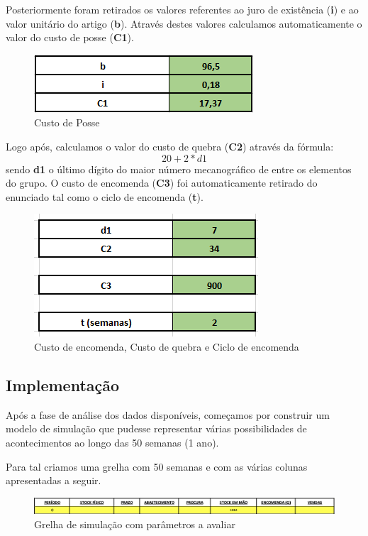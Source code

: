 \documentclass[a4paper]{article}
\begin{document}
Posteriormente foram retirados os valores referentes ao juro de existência (\textbf{i}) e ao valor unitário do artigo (\textbf{b}). Através destes valores calculamos automaticamente o valor do custo de posse (\textbf{C1}).

\begin{figure}[H]
\centering
\includegraphics[scale=0.7]{Posse.png}
\caption{Custo de Posse}
\label{img:Posse}
\end{figure}

Logo após, calculamos o valor do custo de quebra (\textbf{C2}) através da fórmula: $$20+2*d1$$ sendo \textbf{d1} o último dígito do maior número mecanográfico de entre os elementos do grupo.
O custo de encomenda (\textbf{C3}) foi automaticamente retirado do enunciado tal como o ciclo de encomenda (\textbf{t}).

\begin{figure}[H]
\centering
\includegraphics[scale=0.6]{c3c2t.png}
\caption{Custo de encomenda, Custo de quebra e Ciclo de encomenda}
\label{img:C3C2t}
\end{figure}


\subsection{Implementação}

Após a fase de análise dos dados disponíveis, começamos por construir um modelo de simulação que pudesse representar várias possibilidades de acontecimentos ao longo das 50 semanas (1 ano).

Para tal criamos uma grelha com 50 semanas e com as várias colunas apresentadas a seguir.

\begin{figure}[H]
\centering
\includegraphics[scale=0.45]{grelha_simulacao.png}
\caption{Grelha de simulação com parâmetros a avaliar}
\label{img:grelha_sim}
\end{figure}
\end{document}

